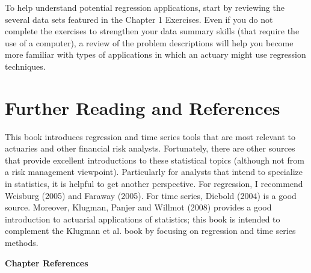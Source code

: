 To help understand potential regression applications, start by
reviewing the several data sets featured in the Chapter 1 Exercises.
Even if you do not complete the exercises to strengthen your data
summary skills (that require the use of a computer), a review of the
problem descriptions will help you become more familiar with types
of applications in which an actuary might use regression techniques.




\section{Further Reading and References}


This book introduces regression and time series tools that are most
relevant to actuaries and other financial risk analysts.
Fortunately, there are other sources that provide excellent
introductions to these statistical topics (although not from a risk
management viewpoint). Particularly for analysts that intend to
specialize in statistics, it is helpful to get another perspective.
For regression, I recommend Weisburg (2005) and Faraway (2005). For
time series, Diebold (2004) is a good source. Moreover, Klugman,
Panjer and Willmot (2008) provides a good introduction to actuarial
applications of statistics; this book is intended to complement the
Klugman et al. book by focusing on regression and time series
methods.

\bigskip

\textbf{Chapter References}

